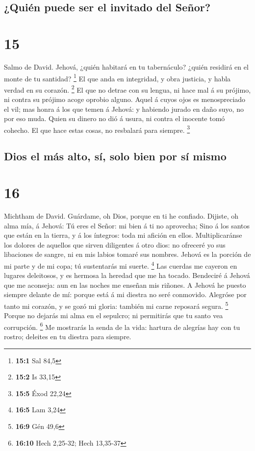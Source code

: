 \hypertarget{quiuxe9n-puede-ser-el-invitado-del-seuxf1or}{%
\subsection{¿Quién puede ser el invitado del
Señor?}\label{quiuxe9n-puede-ser-el-invitado-del-seuxf1or}}

\hypertarget{section-14}{%
\section{15}\label{section-14}}

 Salmo de David. Jehová, ¿quién habitará en tu tabernáculo?
¿quién residirá en el monte de tu santidad? \footnote{\textbf{15:1} Sal
  84,5}  El que anda en integridad, y obra justicia, y habla
verdad en su corazón. \footnote{\textbf{15:2} Is 33,15}  El
que no detrae con su lengua, ni hace mal á su prójimo, ni contra su
prójimo acoge oprobio alguno.  Aquel á cuyos ojos es
menospreciado el vil; mas honra á los que temen á Jehová: y habiendo
jurado en daño suyo, no por eso muda.  Quien su dinero no
dió á usura, ni contra el inocente tomó cohecho. El que hace estas
cosas, no resbalará para siempre. \footnote{\textbf{15:5} Éxod 22,24}

\hypertarget{dios-el-muxe1s-alto-suxed-solo-bien-por-suxed-mismo}{%
\subsection{Dios el más alto, sí, solo bien por sí
mismo}\label{dios-el-muxe1s-alto-suxed-solo-bien-por-suxed-mismo}}

\hypertarget{section-15}{%
\section{16}\label{section-15}}

 Michtham de David. Guárdame, oh Dios, porque en ti he
confiado.  Dijiste, oh alma mía, á Jehová: Tú eres el Señor:
mi bien á ti no aprovecha;  Sino á los santos que están en
la tierra, y á los íntegros: toda mi afición en ellos. 
Multiplicaránse los dolores de aquellos que sirven diligentes á otro
dios: no ofreceré yo sus libaciones de sangre, ni en mis labios tomaré
sus nombres.  Jehová es la porción de mi parte y de mi copa;
tú sustentarás mi suerte. \footnote{\textbf{16:5} Lam 3,24} 
Las cuerdas me cayeron en lugares deleitosos, y es hermosa la heredad
que me ha tocado.  Bendeciré á Jehová que me aconseja: aun
en las noches me enseñan mis riñones.  A Jehová he puesto
siempre delante de mí: porque está á mi diestra no seré conmovido.
 Alegróse por tanto mi corazón, y se gozó mi gloria: también
mi carne reposará segura. \footnote{\textbf{16:9} Gén 49,6}
 Porque no dejarás mi alma en el sepulcro; ni permitirás
que tu santo vea corrupción. \footnote{\textbf{16:10} Hech 2,25-32; Hech
  13,35-37}  Me mostrarás la senda de la vida: hartura de
alegrías hay con tu rostro; deleites en tu diestra para siempre.


